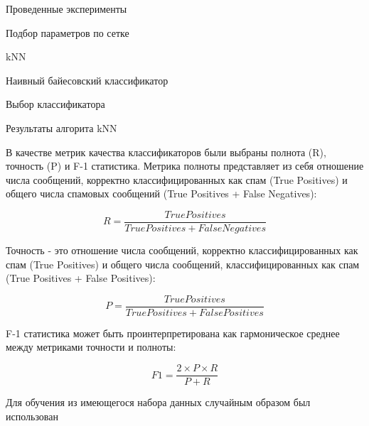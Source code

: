 \begin{section}{Проведенные эксперименты}
\begin{subsection}{Подбор параметров по сетке}
\begin{subsubsection}{kNN}
\end{subsubsection}


\begin{subsubsection}{Наивный байесовский классификатор}

\end{subsubsection}

\end{subsection}

\begin{subsection}{Выбор классификатора}

Результаты алгорита kNN


В качестве метрик качества классификаторов были выбраны полнота (R), точность (P) и F-1 статистика. Метрика полноты представляет из себя отношение числа сообщений, корректно классифицированных как спам (True Positives) и общего числа спамовых сообщений (True Positives + False Negatives):

\begin{equation}
  R = \frac{True Positives}{True Positives + False Negatives}
\end{equation}

Точность - это отношение числа сообщений, корректно классифицированных как спам (True Positives) и общего числа  сообщений, классифицированных как спам (True Positives + False Positives):

\begin{equation}
  P = \frac{True Positives}{True Positives + False Positives}
\end{equation}

F-1 статистика может быть проинтерпретирована как гармоническое среднее между метриками точности и полноты:

\begin{equation}
  F1 = \frac{2 \times P \times R}{P + R}
\end{equation}



Для обучения из имеющегося набора данных случайным образом был использован







\begin{table}[H]
\centering
{}


\end{table}
\end{subsection}
\end{section}
